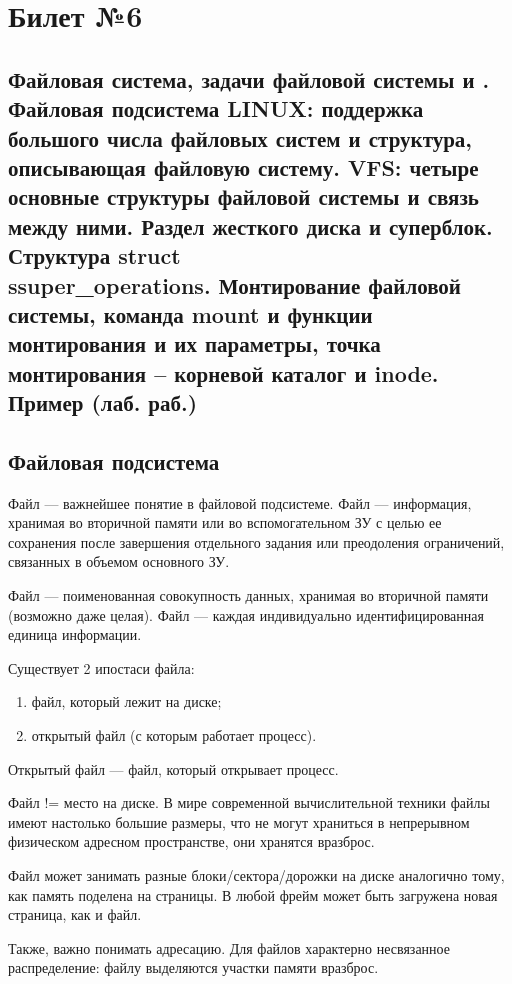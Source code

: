 \chapter{Билет №6}

\section*{Файловая система, задачи файловой системы и . Файловая подсистема LINUX: поддержка большого числа файловых систем и структура, описывающая файловую систему. VFS: четыре основные структуры файловой системы и связь между ними. Раздел жесткого диска и суперблок. Структура struct \\ ssuper\_operations. Монтирование файловой системы, команда mount и функции монтирования и их параметры, точка монтирования – корневой каталог и inode. Пример (лаб. раб.)}

\section{Файловая подсистема}
Файл --- важнейшее понятие в файловой подсистеме. Файл --- информация, хранимая во вторичной памяти или во вспомогательном ЗУ с целью ее сохранения после завершения отдельного задания или преодоления ограничений, связанных в объемом основного ЗУ.

Файл --- поименованная совокупность данных, хранимая во вторичной памяти (возможно даже целая). Файл --- каждая индивидуально идентифицированная единица информации.

Существует 2 ипостаси файла:
\begin{enumerate}
	\item файл, который лежит на диске;
	\item открытый файл (с которым работает процесс).
\end{enumerate}

Открытый файл --- файл, который открывает процесс.

Файл != место на диске. В мире современной вычислительной техники файлы имеют настолько большие размеры, что не могут храниться в непрерывном физическом адресном пространстве, они хранятся вразброс.

Файл может занимать разные блоки/сектора/дорожки на диске аналогично тому, как память поделена на страницы. В любой фрейм может быть загружена новая страница, как и файл. 

Также, важно понимать адресацию. Для файлов характерно несвязанное распределение: файлу выделяются участки памяти вразброс.

